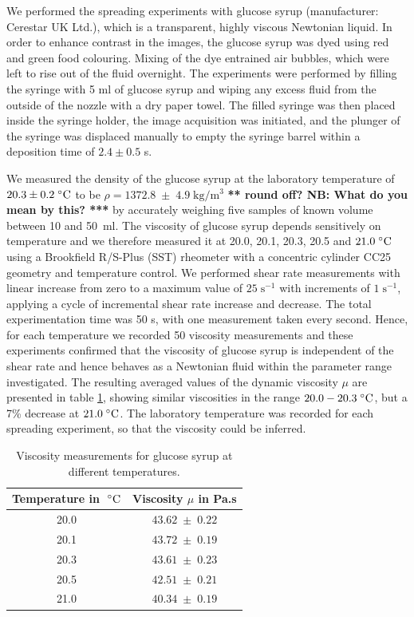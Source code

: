 \documentclass[aip,graphicx]{revtex4-1}
\newcommand{\sym}[1]{\text{#1}} \newcommand{\dif}{\mathrm{d}}
\begin{document}
We performed the spreading experiments with glucose syrup (manufacturer: Cerestar UK Ltd.), which is a transparent, highly viscous Newtonian
liquid. In order to enhance contrast in the images, the glucose syrup
was dyed using red and green food colouring.  Mixing of the dye
entrained air bubbles, which were left to rise out of the fluid
overnight. The experiments were performed by filling the syringe with
5 ml of glucose syrup and wiping any excess fluid from the outside of
the nozzle with a dry paper towel. The filled syringe was then placed
inside the syringe holder, the image acquisition was initiated, and
the plunger of the syringe was displaced manually to empty the
syringe barrel within a deposition time of $2.4 \pm 0.5$ s.

We measured the density of the glucose syrup at the laboratory temperature
of $20.3 \pm 0.2 \; ^{\circ} \text{C}$ to be $\rho=1372.8 \; \pm \; 4.9 \;
\sym{kg}/\sym{m}^3$ {\bf *** round off? NB: What do you mean by this? ***}  by accurately weighing five samples of known
volume between 10 and 50~ml.  The viscosity of glucose syrup depends
sensitively on temperature \cite{llewellin2002rheology} and we
therefore measured it at 20.0, 20.1, 20.3, 20.5 and $21.0 \; ^{\circ} \text{C}$
using a Brookfield R/S-Plus (SST) rheometer with a concentric cylinder
CC25 geometry and temperature control. We performed shear rate
measurements with linear increase from zero to a maximum value of $25
\; \sym{s}^{-1}$ with increments of $1 \; \sym{s}^{-1}$, applying a
cycle of incremental shear rate increase and decrease.  The total
experimentation time was 50 s, with one measurement taken every
second. Hence, for each temperature we recorded 50 viscosity
measurements and these experiments confirmed that the viscosity of
glucose syrup is independent of the shear rate and hence behaves as a
Newtonian fluid within the parameter range investigated. The resulting
averaged values of the dynamic viscosity $\mu$ are presented in table
\ref{tab:glucose_viscosity}, showing similar viscosities in the range
$20.0 - 20.3 \; ^{\circ} \text{C}$, but a 7\% decrease at $21.0 \; ^{\circ} \text{C}$. The
laboratory temperature was recorded for each spreading experiment, so
that the viscosity could be inferred. 


{\renewcommand{\arraystretch}{1.2}
 \begin{table}[!ht]
 \begin{center}
 \begin{tabular}{c | c}
  Temperature in $\; ^{\circ} \text{C}$ & Viscosity $\mu$ in Pa.s \\ \hline 20.0 &
  $43.62 \; \pm \; 0.22$ \\ 20.1 & $43.72 \; \pm \; 0.19$ \\ 20.3 &
  $43.61 \; \pm \; 0.23$ \\ 20.5 & $42.51 \; \pm \; 0.21$ \\ 21.0 &
  $40.34 \; \pm \; 0.19$\\
 \end{tabular}
 \caption{Viscosity measurements for glucose syrup at different
   temperatures.}
 \label{tab:glucose_viscosity}
 \end{center}
 \end{table}}
\end{document}
